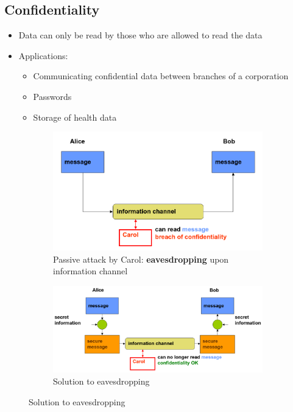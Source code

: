 \documentclass[11pt,british,faculty=ea,layout=titlefont,underline=false,titleUppercase=true,titleUnderline=true,hidelinks]{ugent2016-report}
\begin{document}
		\subsection{Confidentiality} \label{sub:confidentiality}
            \begin{itemize}
                \item Data can only be read by those who are allowed to read the data
                \item Applications:
                \begin{itemize}
                    \item Communicating confidential data between branches of a corporation
                    \item Passwords
                    \item Storage of health data
                \end{itemize}
            \end{itemize}
            \begin{figure}[h]
                \centering
                \begin{subfigure}{.40\textwidth}
                    \centering
                    \includegraphics[width=\linewidth]{images/data-confidentiality-threat.png}
                    \caption{Passive attack by Carol: \textbf{eavesdropping} upon information channel}
                    \label{fig:eavesdropping}
                \end{subfigure}
                \begin{subfigure}{.50\textwidth}
                    \centering
                    \includegraphics[width=\linewidth]{images/data-confidentiality-solution.png}
                    \caption{Solution to eavesdropping}
                    \label{fig:eavesdropping-solution}
                \end{subfigure}
            \end{figure}
            
\end{document}
